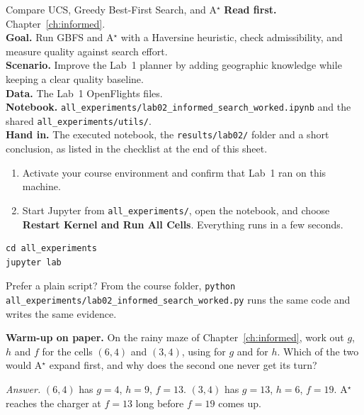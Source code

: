 
\begin{labproject}{Compare UCS, Greedy Best-First Search, and A$^\star$}
\textbf{Read first.} Chapter~\ref{ch:informed}.\\
\textbf{Goal.} Run GBFS and A$^\star$ with a Haversine heuristic, check admissibility, and measure quality against search effort.\\
\textbf{Scenario.} Improve the Lab~1 planner by adding geographic knowledge while keeping a clear quality baseline.\\
\textbf{Data.} The Lab~1 OpenFlights files.\\
\textbf{Notebook.} \texttt{all\_experiments/lab02\_informed\_search\_worked.ipynb} and the shared \texttt{all\_experiments/utils/}.\\
\textbf{Hand in.} The executed notebook, the \texttt{results/lab02/} folder and a short conclusion, as listed in the checklist at the end of this sheet.
\end{labproject}

\begin{labmode}
\begin{enumerate}
  \item Activate your course environment and confirm that Lab~1 ran on this machine.
  \item Start Jupyter from \texttt{all\_experiments/}, open the notebook, and choose \textbf{Restart Kernel and Run All Cells}. Everything runs in a few seconds.
\end{enumerate}
\begin{lstlisting}[style=utpterminal]
cd all_experiments
jupyter lab
\end{lstlisting}
Prefer a plain script? From the course folder, \texttt{python all\_experiments/lab02\_informed\_search\_worked.py} runs the same code and writes the same evidence.
\end{labmode}



\labroutine

\begin{yourturn}
\textbf{Warm-up on paper.} On the rainy maze of Chapter~\ref{ch:informed}, work out $g$, $h$ and $f$ for the cells $(6,4)$ and $(3,4)$, using  for $g$ and  for $h$. Which of the two would A$^\star$ expand first, and why does the second one never get its turn?

\emph{Answer.} $(6,4)$ has $g=4$, $h=9$, $f=13$. $(3,4)$ has $g=13$, $h=6$, $f=19$. A$^\star$ reaches the charger at $f=13$ long before $f=19$ comes up.
\end{yourturn}

